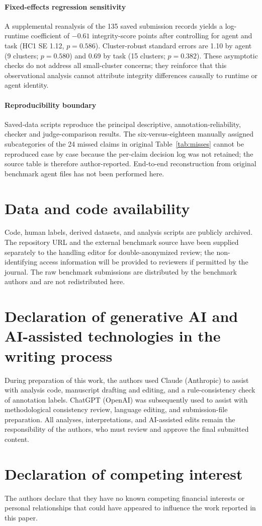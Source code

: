 \documentclass[preprint,12pt,authoryear]{elsarticle}
\newif\ifanon \anontrue
\begin{document}
\paragraph{Fixed-effects regression sensitivity} A supplemental reanalysis of the 135 saved submission records yields a log-runtime coefficient of $-0.61$ integrity-score points after controlling for agent and task (HC1 SE 1.12, $p=0.586$). Cluster-robust standard errors are 1.10 by agent (9 clusters; $p=0.580$) and 0.69 by task (15 clusters; $p=0.382$). These asymptotic checks do not address all small-cluster concerns; they reinforce that this observational analysis cannot attribute integrity differences causally to runtime or agent identity.

\paragraph{Reproducibility boundary} Saved-data scripts reproduce the principal descriptive, annotation-reliability, checker and judge-comparison results. The six-versus-eighteen manually assigned subcategories of the 24 missed claims in original Table~\ref{tab:misses} cannot be reproduced case by case because the per-claim decision log was not retained; the source table is therefore author-reported. End-to-end reconstruction from original benchmark agent files has not been performed here.

\clearpage
\section*{Data and code availability}
\ifanon
Code, human labels, derived datasets, and analysis scripts are publicly archived. The repository URL and the external benchmark source have been supplied separately to the handling editor for double-anonymized review; the non-identifying access information will be provided to reviewers if permitted by the journal. The raw benchmark submissions are distributed by the benchmark authors and are not redistributed here.
\else
Code, human labels, derived datasets, and analysis scripts are publicly archived at \url{https://github.com/mos3b-faqeeh/agent-integrity-analysis}. The raw benchmark submissions are distributed by the benchmark authors and are not redistributed here.
\fi

\section*{Declaration of generative AI and AI-assisted technologies in the writing process}
During preparation of this work, the authors used Claude (Anthropic) to assist with analysis code, manuscript drafting and editing, and a rule-consistency check of annotation labels. ChatGPT (OpenAI) was subsequently used to assist with methodological consistency review, language editing, and submission-file preparation. All analyses, interpretations, and AI-assisted edits remain the responsibility of the authors, who must review and approve the final submitted content.

\section*{Declaration of competing interest}
The authors declare that they have no known competing financial interests or personal relationships that could have appeared to influence the work reported in this paper.



\end{document}
